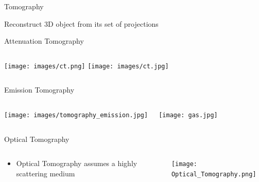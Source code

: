 \documentclass[compress,red,12pt]{beamer}
\begin{document}
\begin{frame}{Tomography}
  \begin{block}{}
    Reconstruct 3D object from its set of projections    
  \end{block}
\end{frame}

\begin{frame}{Attenuation Tomography}
  \begin{columns}
    \texttt{[image: images/ct.png]}
    \texttt{[image: images/ct.jpg]}
  \end{columns}  
  \begin{flushright}
  \end{flushright}
  {
  }
\end{frame}


\begin{frame}{Emission Tomography}
  \begin{columns}
    \begin{center}
      \texttt{[image: images/tomography\_emission.jpg]}
    \end{center}
    \begin{center}
      \texttt{[image: gas.jpg]}
    \end{center}
  \end{columns}
  {
  }
\end{frame}


\begin{frame}{Optical Tomography}
  \begin{columns}[C]
    \begin{column}{.7\textwidth}
      \begin{itemize}
      \item Optical Tomography assumes a highly scattering medium
      \end{itemize}
    \end{column}
    \begin{column}{.3\textwidth}
      \centering
      \texttt{[image: Optical\_Tomography.png]}
    \end{column}
  \end{columns}  
  {
  }
\end{frame}
\end{document}
